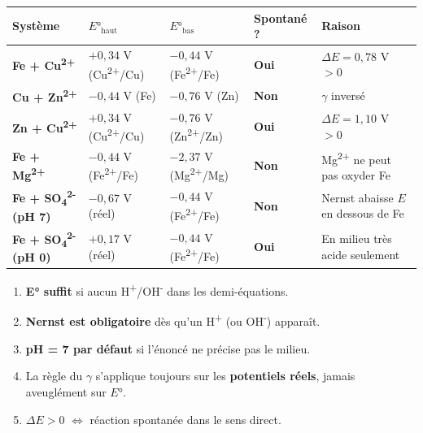 \documentclass[a4paper, 11pt]{article}
\begin{document}
\begin{tabular}{>{\bfseries}p{4.2cm} p{2.5cm} p{2.5cm} p{1.8cm} p{3.5cm}}
\toprule
\rowcolor{bleu!85}\color{white}Système &
  \color{white}$E°_{\text{haut}}$ &
  \color{white}$E°_{\text{bas}}$ &
  \color{white}Spontané ? &
  \color{white}Raison \\
\midrule
Fe + Cu\textsuperscript{2+} &
  $+0{,}34$ V \newline (Cu\textsuperscript{2+}/Cu) &
  $-0{,}44$ V \newline (Fe\textsuperscript{2+}/Fe) &
  \textcolor{vertf}{\textbf{Oui}} &
  $\Delta E = 0{,}78$ V $> 0$ \\
Cu + Zn\textsuperscript{2+} &
  $-0{,}44$ V (Fe) &
  $-0{,}76$ V (Zn) &
  \textcolor{rougef}{\textbf{Non}} &
  $\gamma$ inversé \\
Zn + Cu\textsuperscript{2+} &
  $+0{,}34$ V \newline (Cu\textsuperscript{2+}/Cu) &
  $-0{,}76$ V \newline (Zn\textsuperscript{2+}/Zn) &
  \textcolor{vertf}{\textbf{Oui}} &
  $\Delta E = 1{,}10$ V $> 0$ \\
Fe + Mg\textsuperscript{2+} &
  $-0{,}44$ V \newline (Fe\textsuperscript{2+}/Fe) &
  $-2{,}37$ V \newline (Mg\textsuperscript{2+}/Mg) &
  \textcolor{rougef}{\textbf{Non}} &
  Mg\textsuperscript{2+} ne peut pas oxyder Fe \\
Fe + SO\textsubscript{4}\textsuperscript{2-} (pH 7) &
  $-0{,}67$ V (réel) &
  $-0{,}44$ V \newline (Fe\textsuperscript{2+}/Fe) &
  \textcolor{rougef}{\textbf{Non}} &
  Nernst abaisse $E$ en dessous de Fe \\
Fe + SO\textsubscript{4}\textsuperscript{2-} (pH 0) &
  $+0{,}17$ V (réel) &
  $-0{,}44$ V \newline (Fe\textsuperscript{2+}/Fe) &
  \textcolor{vertf}{\textbf{Oui}} &
  En milieu très acide seulement \\
\bottomrule
\end{tabular}

\vspace{10pt}

\begin{tcolorbox}[alertebox, title={À retenir absolument}]
\begin{enumerate}
  \item \textbf{E° suffit} si aucun H\textsuperscript{+}/OH\textsuperscript{-} dans les demi-équations.
  \item \textbf{Nernst est obligatoire} dès qu'un H\textsuperscript{+} (ou OH\textsuperscript{-}) apparaît.
  \item \textbf{pH = 7 par défaut} si l'énoncé ne précise pas le milieu.
  \item La règle du $\gamma$ s'applique toujours sur les \textbf{potentiels réels}, jamais aveuglément sur $E°$.
  \item $\Delta E > 0$ $\Leftrightarrow$ réaction spontanée dans le sens direct.
\end{enumerate}
\end{tcolorbox}
\end{document}

